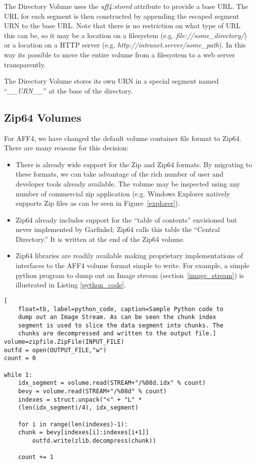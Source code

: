 \documentclass[10pt, conference]{IEEEtran}
\begin{document}
The Directory Volume uses the {\em aff4:stored} attribute to provide a
base URL. The URL for each segment is then constructed by appending
the escaped segment URN to the base URL. Note that there is no
restriction on what type of URL this can be, so it may be a location
on a filesystem (e.g. {\em file://some\_directory/}) or a location on a
HTTP server (e.g. {\em http://intranet.server/some\_path}). In this
way its possible to move the entire volume from a filesystem to a web
server transparently.

The Directory Volume stores its own URN in a special segment named
``{\em \_\_URN\_\_}'' at the base of the directory.

\subsection{Zip64 Volumes}
For AFF4, we have changed the default volume container file format to
Zip64\cite{zip-format}. There are many reasons for this decision:

\begin{itemize}
\item There is already wide support for the Zip and Zip64 formats. By
  migrating to these formats, we can take advantage of the rich number
  of user and developer tools already available. The volume may be
  inspected using any number of commercial zip application
  (e.g. Windows Explorer natively supports Zip files as can be seen in
  Figure~\ref{explorer}).
 
\item Zip64 already includes support for the ``table of contents''
  envisioned but never implemented by Garfinkel; Zip64 calls this
  table the ``Central Directory.'' It is written at the end of the
  Zip64 volume.

\item Zip64 libraries are readily available making proprietary implementations of
interfaces to the AFF4 volume format simple to write. For example, a
simple python program to dump out an Image stream
(section~\ref{image_stream}) is illustrated in Listing
\ref{python_code}.

\end{itemize}

\begin{lstlisting}[
	float=tb, label=python_code, caption=Sample Python code to
	dump out an Image Stream. As can be seen the chunk index
	segment is used to slice the data segment into chunks. The
	chunks are decompressed and written to the output file.]
volume=zipfile.ZipFile(INPUT_FILE)
outfd = open(OUTPUT_FILE,"w")
count = 0

while 1:
    idx_segment = volume.read(STREAM+"/%08d.idx" % count)
    bevy = volume.read(STREAM+"/%08d" % count)
    indexes = struct.unpack("<" + "L" * 
	(len(idx_segment)/4), idx_segment)

    for i in range(len(indexes)-1):
	chunk = bevy[indexes[i]:indexes[i+1]]
        outfd.write(zlib.decompress(chunk))

    count += 1
\end{lstlisting}
\end{document}
